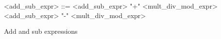 \begin{Grammar}
 \begin{grammar}

    <add\_sub\_expr> ::= <add\_sub\_expr> "+" <mult\_div\_mod\_expr>
    \alt <add\_sub\_expr> "-" <mult\_div\_mod\_expr>
  
 \end{grammar}
 \caption{Add and sub expressions}\label{gra:addsub}
\end{Grammar}
